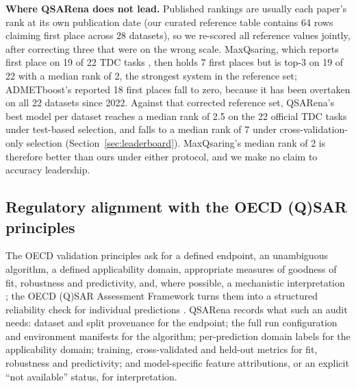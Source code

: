 \textbf{Where QSARena does not lead.} Published rankings are usually each paper's rank at its own publication date (our curated reference table contains 64 rows claiming first place across 28 datasets), so we re-scored all reference values jointly, after correcting three that were on the wrong scale. MaxQsaring, which reports first place on 19 of 22 TDC tasks \cite{xu2025maxqsaring}, then holds 7 first places but is top-3 on 19 of 22 with a median rank of 2, the strongest system in the reference set; ADMETboost's reported 18 first places \cite{tian2022admetboost} fall to zero, because it has been overtaken on all 22 datasets since 2022. Against that corrected reference set, QSARena's best model per dataset reaches a median rank of 2.5 on the 22 official TDC tasks under test-based selection, and falls to a median rank of 7 under cross-validation-only selection (Section~\ref{sec:leaderboard}). MaxQsaring's median rank of 2 is therefore better than ours under either protocol, and we make no claim to accuracy leadership.

\subsection{Regulatory alignment with the OECD (Q)SAR principles}\label{sec:oecd}

The OECD validation principles ask for a defined endpoint, an unambiguous algorithm, a defined applicability domain, appropriate measures of goodness of fit, robustness and predictivity, and, where possible, a mechanistic interpretation \cite{oecd2004principles}; the OECD (Q)SAR Assessment Framework turns them into a structured reliability check for individual predictions \cite{oecd2023qaf}. QSARena records what such an audit needs: dataset and split provenance for the endpoint; the full run configuration and environment manifests for the algorithm; per-prediction domain labels for the applicability domain; training, cross-validated and held-out metrics for fit, robustness and predictivity; and model-specific feature attributions, or an explicit ``not available'' status, for interpretation.

